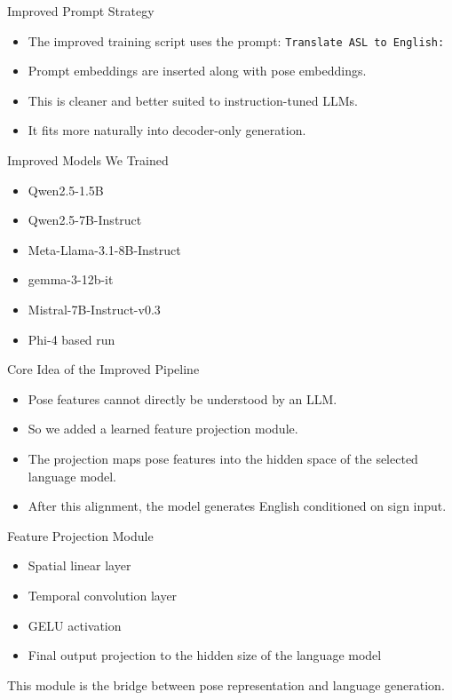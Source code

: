\documentclass[aspectratio=169]{beamer}
\begin{document}
\begin{frame}{Improved Prompt Strategy}
\begin{itemize}
  \item The improved training script uses the prompt: \texttt{Translate ASL to English:}
  \item Prompt embeddings are inserted along with pose embeddings.
  \item This is cleaner and better suited to instruction-tuned LLMs.
  \item It fits more naturally into decoder-only generation.
\end{itemize}
\end{frame}

\begin{frame}{Improved Models We Trained}
\begin{itemize}
  \item Qwen2.5-1.5B
  \item Qwen2.5-7B-Instruct
  \item Meta-Llama-3.1-8B-Instruct
  \item gemma-3-12b-it
  \item Mistral-7B-Instruct-v0.3
  \item Phi-4 based run
\end{itemize}
\end{frame}

\begin{frame}{Core Idea of the Improved Pipeline}
\begin{itemize}
  \item Pose features cannot directly be understood by an LLM.
  \item So we added a learned feature projection module.
  \item The projection maps pose features into the hidden space of the selected language model.
  \item After this alignment, the model generates English conditioned on sign input.
\end{itemize}
\end{frame}

\begin{frame}{Feature Projection Module}
\begin{itemize}
  \item Spatial linear layer
  \item Temporal convolution layer
  \item GELU activation
  \item Final output projection to the hidden size of the language model
\end{itemize}
\vspace{0.5em}
This module is the bridge between pose representation and language generation.
\end{frame}
\end{document}
